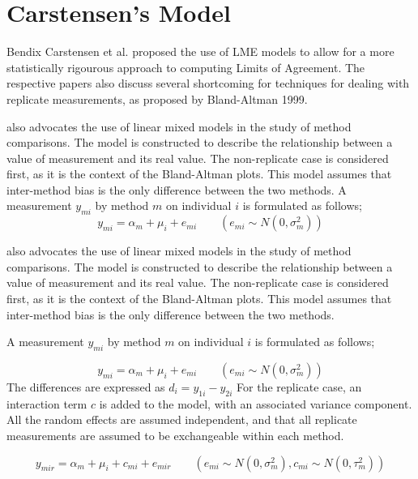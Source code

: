 \documentclass{report}
\begin{document}
	
	
	
	\section{Carstensen's Model}
	Bendix Carstensen et al. proposed the use of LME models to allow for a more statistically rigourous approach to computing Limits of Agreement.  The respective papers also discuss several shortcoming for techniques for dealing with replicate measurements, as proposed by Bland-Altman 1999.
	
	\citet{BXC2004} also advocates the use of linear mixed models in
	the study of method comparisons. The model is constructed to
	describe the relationship between a value of measurement and its
	real value. The non-replicate case is considered first, as it is
	the context of the Bland-Altman plots. This model assumes that
	inter-method bias is the only difference between the two methods.
	A measurement $y_{mi}$ by method $m$ on individual $i$ is
	formulated as follows;
	\begin{equation}
	y_{mi}  = \alpha_{m} + \mu_{i} + e_{mi} \qquad ( e_{mi} \sim
	N(0,\sigma^{2}_{m}))
	\end{equation}
	
	\citet{BXC2004} also advocates the use of linear mixed models in
	the study of method comparisons. The model is constructed to
	describe the relationship between a value of measurement and its
	real value. The non-replicate case is considered first, as it is
	the context of the Bland-Altman plots. This model assumes that
	inter-method bias is the only difference between the two methods.
	
	A measurement $y_{mi}$ by method $m$ on individual $i$ is formulated as follows;
	
	\begin{equation}
	y_{mi}  = \alpha_{m} + \mu_{i} + e_{mi} \qquad ( e_{mi} \sim
	N(0,\sigma^{2}_{m}))
	\end{equation}
	The differences are expressed as $d_{i} = y_{1i} - y_{2i}$ For the
	replicate case, an interaction term $c$ is added to the model,
	with an associated variance component. All the random effects are
	assumed independent, and that all replicate measurements are
	assumed to be exchangeable within each method.
	
	\begin{equation}
	y_{mir}  = \alpha_{m} + \mu_{i} + c_{mi} + e_{mir} \qquad ( e_{mi}
	\sim N(0,\sigma^{2}_{m}), c_{mi} \sim N(0,\tau^{2}_{m}))
	\end{equation}
	
\end{document}
